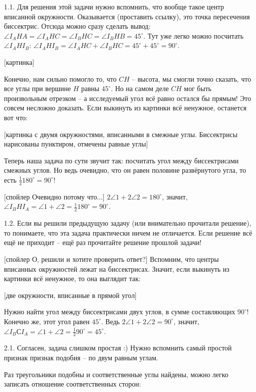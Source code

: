 1.1. Для решения этой задачи нужно вспомнить, что вообще такое центр вписанной окружности. 
Оказывается (проставить ссылку), это точка пересечения биссектрис. Отсюда можно сразу сделать вывод: 
$\angle I_A H A = \angle I_A H C = \angle I_B H C = \angle I_B H B = 45^\circ$. Тут уже легко можно посчитать $\angle I_A H I_B$:
$\angle I_A H I_B = \angle I_A H C + \angle I_B H C = 45^\circ + 45^\circ = 90^\circ$.

[картинка]

Конечно, нам сильно помогло то, что $CH$ -- высота, мы смогли точно сказать, что все углы при вершине $H$ равны $45^\circ$. 
Но на самом деле $CH$ мог быть произвольным отрезком -- а исследуемый угол всё равно остался бы прямым! 
Это совсем несложно доказать. Если выкинуть из картинки всё ненужное, останется вот что:

[картинка с двумя окружностями, вписанными в смежные углы. Биссектрисы нарисованы пунктиром, отмечены равные углы]

Теперь наша задача по сути звучит так: посчитать угол между биссектрисами смежных углов. 
Но ведь очевидно, что он равен половине развёрнутого угла, то есть $\frac{1}{2} 180^\circ = 90^\circ$!

[спойлер Очевидно потому что...] $2\angle 1 + 2\angle 2 = 180^\circ$, значит, $\angle I_B H I_A = \angle 1 + \angle 2 = \frac{1}{2} 180^\circ = 90^\circ$.

1.2. Если вы решили предыдущую задачу (или внимательно прочитали решение), то понимаете, что эта задача практически ничем не отличается.
Если решение всё ещё не приходит -- ещё раз прочитайте решение прошлой задачи!

[спойлер О, решили и хотите проверить ответ?] Вспомним, что центры вписанных окружностей лежат на биссектрисах. 
Значит, если выкинуть из картинки всё ненужное, то она выглядит так:

[две окружности, вписанные в прямой угол]

Нужно найти угол между биссектрисами двух углов, в сумме составляющих $90^\circ$! Конечно же, этот угол равен $45^\circ$.
Ведь $2\angle 1 + 2\angle 2 = 90^\circ$, значит, $\angle I_B С I_A = \angle 1 + \angle 2 = \frac{1}{2} 90^\circ = 45^\circ$.

2.1. Согласен, задача слишком простая :) Нужно вспомнить самый простой признак признак подобия -- по двум равным углам.

Раз треугольники подобны и соответственные углы найдены, можно легко записать отношение соответственных сторон:

